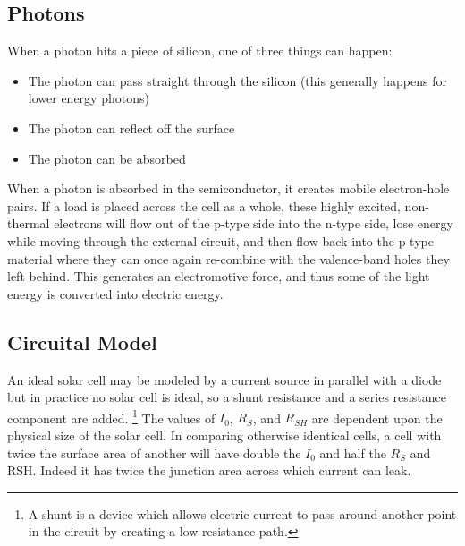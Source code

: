 \documentclass[11pt]{article} %
\begin{document}
\subsection{Photons}
%

When a photon hits a piece of silicon, one of three things can happen:  
\begin{itemize}
	\item The photon can pass straight through the silicon (this generally happens for lower energy photons) 
	\item The photon can reflect off the surface 
	\item The photon can be absorbed 
\end{itemize}

When a photon is absorbed in the semiconductor, it creates mobile electron-hole pairs. If a load is placed across the cell as a whole, these highly excited, non-thermal electrons will flow out of the p-type side into the n-type side, lose energy while moving through the external circuit, and then flow back into the p-type material where they can once again re-combine with the valence-band holes they left behind. This generates an electromotive force, and thus some of the light energy is converted into electric energy.

\subsection {Circuital Model}
%

An ideal solar cell may be modeled by a current source in parallel with a diode but in practice no solar cell is ideal, so a shunt resistance and a series resistance component are added. \footnote{A shunt is a device which allows  electric current  to pass around another point in the  circuit  by creating a low resistance path.} The values of $I_{0}$, $R_{S}$, and $R_{SH}$ are dependent upon the physical size of the solar cell. In comparing otherwise identical cells, a cell with twice the surface area of another will have double the $I_{0}$ and half the $R_{S}$ and RSH. Indeed it has twice the junction area across which current can leak.
\end{document}
